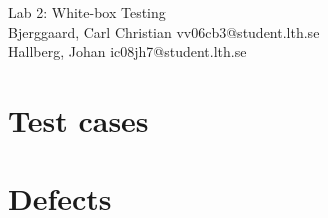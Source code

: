 \documentclass[titlepage]{article}
\begin{document}
\begin{center}
	\huge{Lab 2: White-box Testing } \\
	\small{Bjerggaard, Carl Christian vv06cb3@student.lth.se \\Hallberg, Johan ic08jh7@student.lth.se}

\vspace*{1cm}

\end{center}

\thispagestyle{empty}

\clearpage
\section{Test cases}
\label{testcases}



\section{Defects}
\label{defects}

%
%

%
\end{document}

